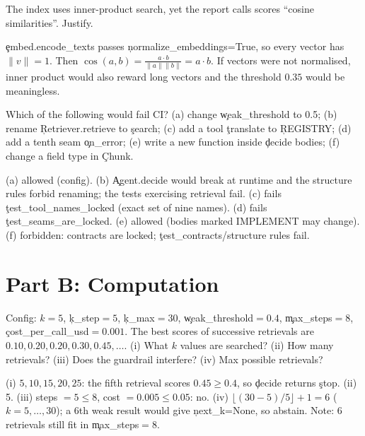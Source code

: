 \begin{problem}[Why cosine = dot product]
The index uses inner-product search, yet the report calls scores ``cosine similarities''. Justify.
\end{problem}
\begin{solution}
\c{embed.encode\_texts} passes \c{normalize\_embeddings=True}, so every vector has $\|v\|=1$. Then $\cos(a,b)=\frac{a\cdot b}{\|a\|\|b\|}=a\cdot b$. If vectors were not normalised, inner product would also reward long vectors and the threshold $0.35$ would be meaningless.
\end{solution}

\begin{problem}
Which of the following would fail CI? (a) change \c{weak\_threshold} to 0.5; (b) rename \c{Retriever.retrieve} to \c{search}; (c) add a tool \c{translate} to \c{REGISTRY}; (d) add a tenth seam \c{on\_error}; (e) write a new function inside \c{decide} bodies; (f) change a field type in \c{Chunk}.
\end{problem}
\begin{solution}
(a) allowed (config). (b) \c{Agent.decide} would break at runtime and the structure rules forbid renaming; the tests exercising retrieval fail. (c) fails \c{test\_tool\_names\_locked} (exact set of nine names). (d) fails \c{test\_seams\_are\_locked}. (e) allowed (bodies marked IMPLEMENT may change). (f) forbidden: contracts are locked; \c{test\_contracts}/structure rules fail.
\end{solution}

\section*{Part B: Computation}
\begin{problem}
Config: $k=5$, \c{k\_step}$=5$, \c{k\_max}$=30$, \c{weak\_threshold}$=0.4$, \c{max\_steps}$=8$, \c{cost\_per\_call\_usd}$=0.001$. The best scores of successive retrievals are $0.10,0.20,0.20,0.30,0.45,\dots$. (i) What $k$ values are searched? (ii) How many retrievals? (iii) Does the guardrail interfere? (iv) Max possible retrievals?
\end{problem}
\begin{solution}
(i) $5,10,15,20,25$: the fifth retrieval scores $0.45\ge0.4$, so \c{decide} returns \c{stop}. (ii) 5. (iii) steps $=5\le8$, cost $=0.005\le0.05$: no. (iv) $\lfloor(30-5)/5\rfloor+1=6$ ($k=5,\dots,30$); a 6th weak result would give \c{next\_k=None}, so abstain. Note: 6 retrievals still fit in \c{max\_steps}$=8$.
\end{solution}

